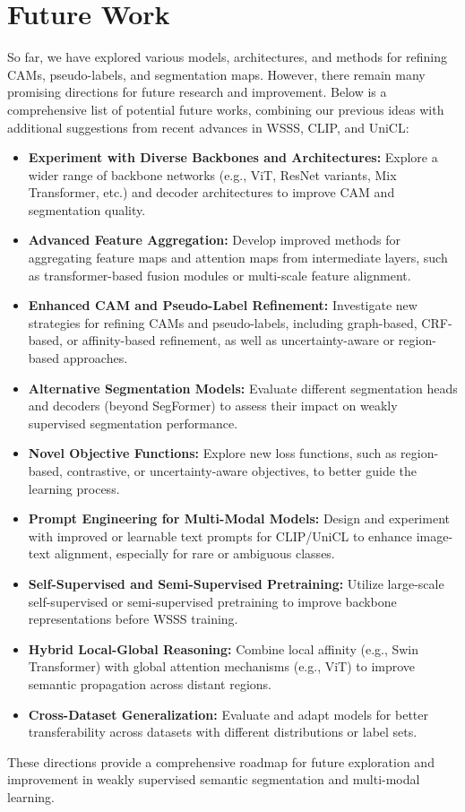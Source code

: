 \section*{Future Work}
\label{sec:future}


So far, we have explored various models, architectures, and methods for refining CAMs, pseudo-labels, and segmentation maps. However, there remain many promising directions for future research and improvement. Below is a comprehensive list of potential future works, combining our previous ideas with additional suggestions from recent advances in WSSS, CLIP, and UniCL:

\begin{itemize}
    \item \textbf{Experiment with Diverse Backbones and Architectures:} Explore a wider range of backbone networks (e.g., ViT, ResNet variants, Mix Transformer, etc.) and decoder architectures to improve CAM and segmentation quality.
    \item \textbf{Advanced Feature Aggregation:} Develop improved methods for aggregating feature maps and attention maps from intermediate layers, such as transformer-based fusion modules or multi-scale feature alignment.
    \item \textbf{Enhanced CAM and Pseudo-Label Refinement:} Investigate new strategies for refining CAMs and pseudo-labels, including graph-based, CRF-based, or affinity-based refinement, as well as uncertainty-aware or region-based approaches.
    \item \textbf{Alternative Segmentation Models:} Evaluate different segmentation heads and decoders (beyond SegFormer) to assess their impact on weakly supervised segmentation performance.
    \item \textbf{Novel Objective Functions:} Explore new loss functions, such as region-based, contrastive, or uncertainty-aware objectives, to better guide the learning process.
    \item \textbf{Prompt Engineering for Multi-Modal Models:} Design and experiment with improved or learnable text prompts for CLIP/UniCL to enhance image-text alignment, especially for rare or ambiguous classes.
    \item \textbf{Self-Supervised and Semi-Supervised Pretraining:} Utilize large-scale self-supervised or semi-supervised pretraining to improve backbone representations before WSSS training.
    \item \textbf{Hybrid Local-Global Reasoning:} Combine local affinity (e.g., Swin Transformer) with global attention mechanisms (e.g., ViT) to improve semantic propagation across distant regions.
    \item \textbf{Cross-Dataset Generalization:} Evaluate and adapt models for better transferability across datasets with different distributions or label sets.
\end{itemize}

These directions provide a comprehensive roadmap for future exploration and improvement in weakly supervised semantic segmentation and multi-modal learning.
